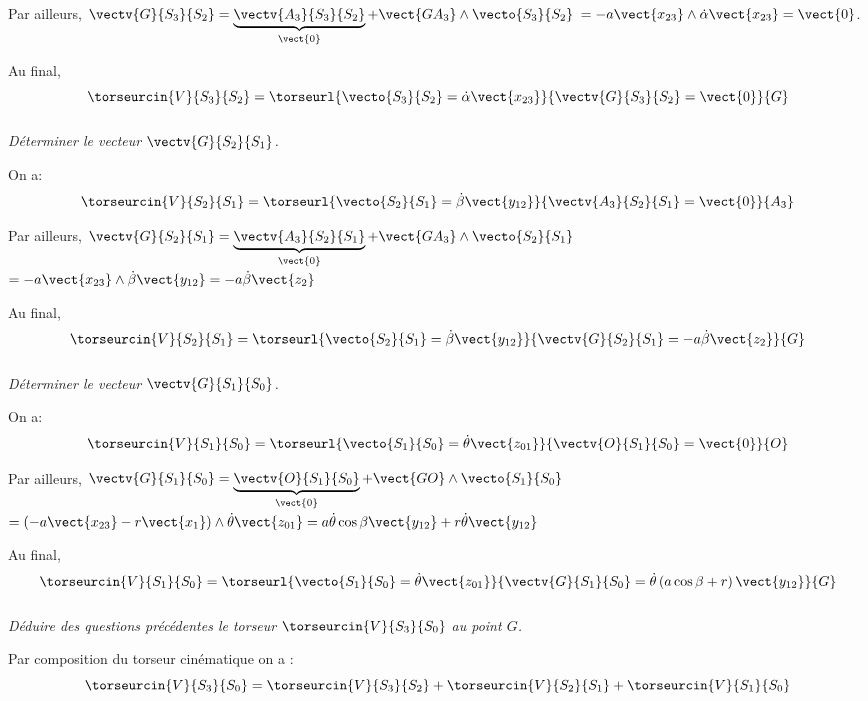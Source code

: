 \begin{multicols}{2}
\begin{corrige}
Par ailleurs, $
\vectv{G}{S_3}{S_2}=\underbrace{\vectv{A_3}{S_3}{S_2}}_{\vect{0}}+\vect{GA_3}\wedge\vecto{S_3}{S_2}$
$=
-a\vect{x_{23}}\wedge \dot{\alpha}\vect{x_{23}}=\vect{0}
$.

Au final, 
$$
\torseurcin{V}{S_3}{S_2} = \torseurl{\vecto{S_3}{S_2}=\dot{\alpha}\vect{x_{23}}}{\vectv{G}{S_3}{S_2}=\vect{0}}{G}
$$

\end{corrige}
\else \fi

\subparagraph{}
\textit{Déterminer le vecteur $\vectv{G}{S_2}{S_1}$.}
\ifprof
\begin{corrige}
On a: 
$$
\torseurcin{V}{S_2}{S_1} = \torseurl{\vecto{S_2}{S_1}=\dot{\beta}\vect{y_{12}}}{\vectv{A_3}{S_2}{S_1}=\vect{0}}{A_3}
$$

Par ailleurs, 
$
\vectv{G}{S_2}{S_1}=\underbrace{\vectv{A_3}{S_2}{S_1}}_{\vect{0}}+\vect{GA_3}\wedge\vecto{S_2}{S_1}$
$=
-a\vect{x_{23}}\wedge \dot{\beta}\vect{y_{12}}=-a\dot{\beta}\vect{z_{2}}
$

Au final, 
$$
\torseurcin{V}{S_2}{S_1} = \torseurl{\vecto{S_2}{S_1}=\dot{\beta}\vect{y_{12}}}{\vectv{G}{S_2}{S_1}=-a\dot{\beta}\vect{z_{2}}}{G}
$$\end{corrige}\else \fi

\subparagraph{}
\textit{Déterminer le vecteur $\vectv{G}{S_1}{S_0}$.}
\ifprof
\begin{corrige}
On a: 
$$
\torseurcin{V}{S_1}{S_0} = \torseurl{\vecto{S_1}{S_0}=\dot{\theta}\vect{z_{01}}}{\vectv{O}{S_1}{S_0}=\vect{0}}{O}
$$

Par ailleurs, 
$
\vectv{G}{S_1}{S_0}=\underbrace{\vectv{O}{S_1}{S_0}}_{\vect{0}}+\vect{GO}\wedge\vecto{S_1}{S_0}$
$=
\left(-a\vect{x_{23}}-r\vect{x_1}\right)\wedge \dot{\theta}\vect{z_{01}}=
a\dot{\theta}\cos\beta\vect{y_{12}}+r\dot{\theta}\vect{y_{12}}
$

Au final, 
$$
\torseurcin{V}{S_1}{S_0} = 
\torseurl{
\vecto{S_1}{S_0}=\dot{\theta}\vect{z_{01}}
}{%
\vectv{G}{S_1}{S_0}
=\dot{\theta}\left(a\cos\beta+r\right)\vect{y_{12}}}{G}
$$

\end{corrige}\else \fi

\subparagraph{}
\textit{Déduire des questions précédentes le torseur $\torseurcin{V}{S_3}{S_0}$ au point $G$.}

\ifprof
\begin{corrige}
Par composition du torseur cinématique on a :
$$
\torseurcin{V}{S_3}{S_0} = 
\torseurcin{V}{S_3}{S_2} + \torseurcin{V}{S_2}{S_1} + \torseurcin{V}{S_1}{S_0}
$$


\end{corrige}
\end{multicols}
